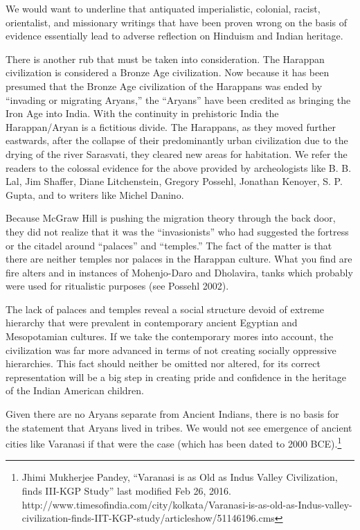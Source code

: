 We would want to underline that antiquated imperialistic, colonial, racist, orientalist, and missionary writings that have been proven wrong on the basis of evidence essentially lead to adverse reflection on Hinduism and Indian heritage. 

There is another rub that must be taken into consideration. The Harappan civilization is considered a Bronze Age civilization. Now because it has been presumed that the Bronze Age civilization of the Harappans was ended by “invading or migrating Aryans,” the “Aryans” have been credited as bringing the Iron Age into India. With the continuity in prehistoric India the Harappan/Aryan is a fictitious divide. The Harappans, as they moved further eastwards, after the collapse of their predominantly urban civilization due to the drying of the river Sarasvati, they cleared new areas for habitation. We refer the readers to the colossal evidence for the above provided by archeologists like B. B. Lal, Jim Shaffer, Diane Litchenstein, Gregory Possehl, Jonathan Kenoyer, S. P. Gupta, and to writers like Michel Danino. 

Because McGraw Hill is pushing the migration theory through the back door, they did not realize that it was the “invasionists” who had suggested the fortress or the citadel around “palaces” and “temples.” The fact of the matter is that there are neither temples nor palaces in the Harappan culture. What you find are fire alters and in instances of Mohenjo-Daro and Dholavira, tanks which probably were used for ritualistic purposes (see Possehl 2002). 

The lack of palaces and temples reveal a social structure devoid of extreme hierarchy that were prevalent in contemporary ancient Egyptian and Mesopotamian cultures. If we take the contemporary mores into account, the civilization was far more advanced in terms of not creating socially oppressive hierarchies. This fact should neither be omitted nor altered, for its correct representation will be a big step in creating pride and confidence in the heritage of the Indian American children. 

Given there are no Aryans separate from Ancient Indians, there is no basis for the statement that Aryans lived in tribes. We would not see emergence of ancient cities like Varanasi if that were the case (which has been dated to 2000 BCE).\footnote{Jhimi Mukherjee Pandey, “Varanasi is as Old as Indus Valley 	Civilization, finds III-KGP Study” last modified Feb 26, 2016. 	http://www.timesofindia.com/city/kolkata/Varanasi-is-as-old-as-Indus-valley-civilization-finds-IIT-KGP-study/articleshow/51146196.cms} 

